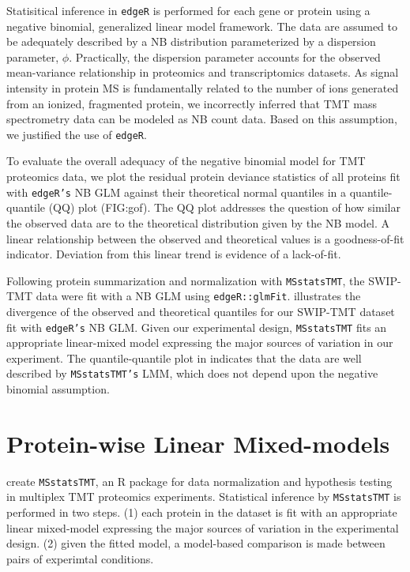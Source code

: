 \documentclass[11pt]{elife}\usepackage[]{graphicx}\usepackage[]{color}
\begin{document}
Statisitical inference in \texttt{edgeR} is performed for each gene or protein
using a negative binomial, generalized linear model framework.  The data are
assumed to be adequately described by a NB distribution parameterized by a
dispersion parameter, $\phi$. Practically, the dispersion parameter accounts for
the observed mean-variance relationship in proteomics and transcriptomics
datasets. As signal intensity in protein MS is fundamentally related to the
number of ions generated from an ionized, fragmented protein, we incorrectly
inferred that TMT mass spectrometry data can be modeled as NB count data. Based
on this assumption, we justified the use of \texttt{edgeR}.  

To evaluate the overall adequacy of the negative binomial model for TMT
proteomics data, we plot the residual protein deviance statistics of all
proteins fit with \texttt{edgeR's} NB GLM against their theoretical normal
quantiles in a quantile-quantile (QQ) plot (FIG:gof).  The QQ plot addresses the
question of how similar the observed data are to the theoretical distribution
given by the NB model.  A linear relationship between the observed and
theoretical values is a goodness-of-fit indicator.  Deviation from this linear
trend is evidence of a lack-of-fit.

Following protein summarization and normalization with \texttt{MSstatsTMT}, the
SWIP-TMT data were fit with a NB GLM using \texttt{edgeR::glmFit}. 
illustrates the divergence of the observed and theoretical quantiles for our
SWIP-TMT dataset fit with \texttt{edgeR's} NB GLM. Given our experimental
design, \texttt{MSstatsTMT} fits an appropriate linear-mixed model expressing
the major sources of variation in our experiment.  The quantile-quantile plot in
 indicates that the data are well described by \texttt{MSstatsTMT's} LMM,
which does not depend upon the negative binomial assumption.\\


\section{Protein-wise Linear Mixed-models}

\cite{Huang2020} create \texttt{MSstatsTMT}, an R package for data
normalization and hypothesis testing in multiplex TMT proteomics experiments. 
Statistical inference by \texttt{MSstatsTMT} is performed in two steps. (1) each
protein in the dataset is fit with an appropriate linear mixed-model expressing
the major sources of variation in the experimental design. (2) given the fitted
model, a model-based comparison is made between pairs of experimtal conditions.
\end{document}
